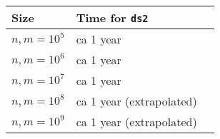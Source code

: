 \documentclass{tufte-handout}
\begin{document}
\bigskip
  \begin{tabular}{lll}
  \toprule
    Size &  Time for \texttt{ds2}  \\\midrule
    $n, m = 10^5$ & ca 1 year \\
    $n, m = 10^6$ & ca 1 year \\
    $n, m = 10^7$ & ca 1 year \\
    $n, m = 10^8$ & ca 1 year (extrapolated)\\
    $n, m = 10^9$ & ca 1 year (extrapolated)\\
  \bottomrule
  \end{tabular}
\end{document}
